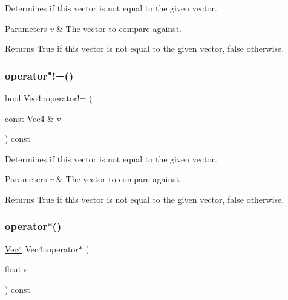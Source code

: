 Determines if this vector is not equal to the given vector.


\begin{DoxyParams}{Parameters}
{\em v} & The vector to compare against.\\
\hline
\end{DoxyParams}
\begin{DoxyReturn}{Returns}
True if this vector is not equal to the given vector, false otherwise. 
\end{DoxyReturn}
\mbox{\label{classVec4_a3b6232cb8bef92bc2137590dace24c61}} 
\subsubsection{\texorpdfstring{operator"!=()}{operator!=()}\hspace{0.1cm}{\footnotesize\ttfamily [2/2]}}
{\footnotesize\ttfamily bool Vec4\+::operator!= (\begin{DoxyParamCaption}\item[{const \hyperlink{classVec4}{Vec4} \&}]{v }\end{DoxyParamCaption}) const\hspace{0.3cm}{\ttfamily [inline]}}

Determines if this vector is not equal to the given vector.


\begin{DoxyParams}{Parameters}
{\em v} & The vector to compare against.\\
\hline
\end{DoxyParams}
\begin{DoxyReturn}{Returns}
True if this vector is not equal to the given vector, false otherwise. 
\end{DoxyReturn}
\mbox{\label{classVec4_ad6bcce9a25272c63a5ad3b8cf658c732}} 
\subsubsection{\texorpdfstring{operator$\ast$()}{operator*()}\hspace{0.1cm}{\footnotesize\ttfamily [1/2]}}
{\footnotesize\ttfamily \hyperlink{classVec4}{Vec4} Vec4\+::operator$\ast$ (\begin{DoxyParamCaption}\item[{float}]{s }\end{DoxyParamCaption}) const\hspace{0.3cm}{\ttfamily [inline]}}

